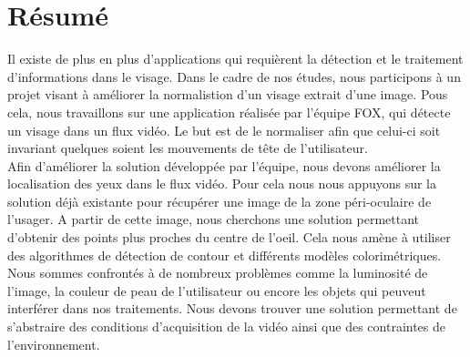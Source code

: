 \section*{Résumé}

Il existe de plus en plus d'applications qui requièrent la détection et le traitement d'informations
dans le visage. Dans le cadre de nos études, nous participons à un projet visant
à améliorer la normalistion d'un visage extrait d'une image. Pous cela, nous travaillons
sur une application réalisée par l'équipe FOX, qui détecte un visage dans un flux vidéo. Le
but est de le normaliser afin que celui-ci soit invariant quelques soient les mouvements de tête de l'utilisateur.\\

Afin d'améliorer la solution développée par l'équipe, nous devons améliorer la localisation des yeux dans le flux vidéo.
Pour cela nous nous appuyons sur la solution déjà existante pour récupérer une image de 
la zone péri-oculaire de l'usager. A partir de cette image, nous cherchons une
solution permettant d'obtenir des points plus proches du centre de l'oeil. Cela nous amène 
à utiliser des algorithmes de détection de contour et différents modèles colorimétriques.\\

Nous sommes confrontés à de nombreux problèmes comme la luminosité de l'image, la couleur de 
peau de l'utilisateur ou encore les objets qui peuveut interférer dans nos traitements.
Nous devons trouver une solution permettant de s'abstraire des conditions d'acquisition
de la vidéo ainsi que des contraintes de l'environnement.


\newpage